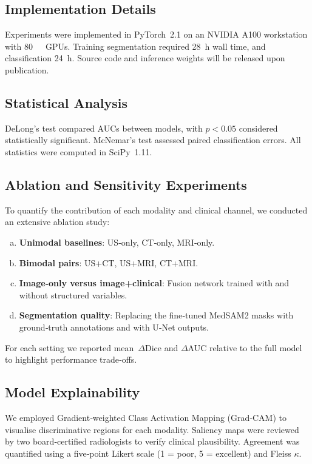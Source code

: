 \documentclass[a4paper, fleqn]{cas-dc}
\begin{document}
    \subsection{Implementation Details}
    Experiments were implemented in PyTorch~2.1 on an NVIDIA A100 workstation
    with \SI{80}{\giga\byte}~GPUs. Training segmentation required \SI{28}{\hour}
    wall time, and classification \SI{24}{\hour}. Source code and inference weights
    will be released upon publication.

    \subsection{Statistical Analysis}
    DeLong's test compared AUCs between models, with $p<0.05$ considered
    statistically significant. McNemar's test assessed paired classification errors.
    All statistics were computed in SciPy~1.11.

    \subsection{Ablation and Sensitivity Experiments}
    To quantify the contribution of each modality and clinical channel, we conducted
    an extensive ablation study:\citep{Kallet2004,Bhattacharyya2018}
    \begin{enumerate}[a)]
        \item \textbf{Unimodal baselines}: US‐only, CT‐only, MRI‐only.

        \item \textbf{Bimodal pairs}: US+CT, US+MRI, CT+MRI.

        \item \textbf{Image‐only versus image+clinical}: Fusion network trained with
            and without structured variables.

        \item \textbf{Segmentation quality}: Replacing the fine‑tuned MedSAM2 masks
            with ground‑truth annotations and with U‑Net outputs.
    \end{enumerate}
    For each setting we reported mean~$\Delta$Dice and $\Delta$AUC relative to
    the full model to highlight performance trade‑offs.

    \subsection{Model Explainability}
    We employed Gradient‐weighted Class Activation Mapping (Grad‑CAM) to
    visualise discriminative regions for each modality. Saliency maps were reviewed
    by two board‑certified radiologists to verify clinical plausibility.
    Agreement was quantified using a five‑point Likert scale (1 = poor, 5 =
    excellent) and Fleiss $\kappa$.
\end{document}
